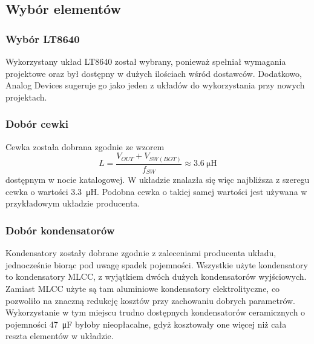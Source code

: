 \documentclass[11pt]{article}
\begin{document}
\begin{figure}[H]
\begin{adjustbox}{width=1.1\textwidth,center}
{

            \label{fig:subfig2}
        }
    \end{adjustbox}
\end{figure}

\subsection{Wybór elementów}
\subsubsection{Wybór LT8640}
Wykorzystany układ LT8640 został wybrany, ponieważ spełniał wymagania projektowe oraz był dostępny w dużych ilościach wśród dostawców. Dodatkowo, Analog Devices sugeruje go jako jeden z układów do wykorzystania przy nowych projektach.

\subsubsection{Dobór cewki}
Cewka została dobrana zgodnie ze wzorem
\[
    L = \frac{V_{OUT} + V_{SW(BOT)}}{f_{SW}} \approx \SI{3.6}{\micro\henry}
\]
dostępnym w nocie katalogowej. W układzie znalazła się więc najbliższa z szeregu cewka o wartości \SI{3.3}{\micro\henry}. Podobna cewka o takiej samej wartości jest używana w przykładowym układzie producenta.

\subsubsection{Dobór kondensatorów}
Kondensatory zostały dobrane zgodnie z zaleceniami producenta układu, jednocześnie biorąc pod uwagę spadek pojemności. Wszystkie użyte kondensatory to kondensatory MLCC, z wyjątkiem dwóch dużych kondensatorów wyjściowych. Zamiast MLCC użyte są tam aluminiowe kondensatory elektrolityczne, co pozwoliło na znaczną redukcję kosztów przy zachowaniu dobrych parametrów. Wykorzystanie w tym miejscu trudno dostępnych kondensatorów ceramicznych o pojemności \SI{47}{\micro\farad} byłoby nieopłacalne, gdyż kosztowały one więcej niż cała reszta elementów w układzie.
\end{document}
